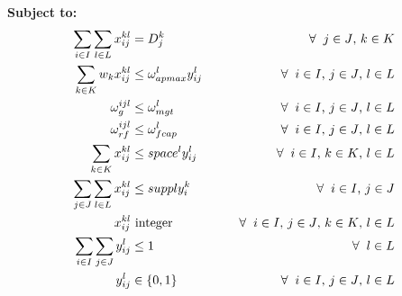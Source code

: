 \textbf{Subject to:}
\begin{align}
\sum_{i\in I}\sum_{l\in L}x_{ij}^{kl}&= D_j^{k} &\forall \hspace{2mm} j \in J \text{, } k\in K \label{eq_demand}\\
\sum_{k\in K}w_{k}x_{ij}^{kl}&\leq \omega_{apmax}^{l}y_{ij}^l &\forall \hspace{2mm} i \in I \text{, } j\in J \text{, } l \in L \label{eq_payloadCap}\\
\omega_{g}^{ijl}&\leq \omega_{mgt}^l &\forall \hspace{2mm} i \in I \text{, } j\in J \text{, } l \in L \label{eq_maxGrosstakeoff}\\
\omega_{rf}^{ijl} &\leq \omega_{fcap}^l &\forall \hspace{2mm} i \in I \text{, } j\in J \text{, } l \in L \label{eq_fuelCap}\\
\sum_{k\in K}x_{ij}^{kl} &\leq space^{l}y_{ij}^l  &\forall \hspace{2mm}  i\in I \text{, } k\in K \text{, } l\in L \label{eq_spaceCap}\\
\sum_{j\in J}\sum_{l \in L}x_{ij}^{kl} &\leq supply_i^k &\forall\hspace{2mm} i \in I \text{, } j\in J \label{eq_supplyconstraint}\\
x_{ij}^{kl}& \text{  integer}  \hspace{15mm}&\forall \hspace{2mm} i\in I \text{, } j \in J \text{, } k\in K \text{, } l \in L \label{eq_IntegerPAllets}\\ 
\sum_{i \in I}\sum_{j\in J}y_{ij}^l &\leq 1 &\forall \hspace{2mm} l \in L \label{eq_AC_Assignment}\\
y_{ij}^l &\in \{0,1\} &\forall \hspace{2mm} i \in I \text{, } j \in J \text{, } l\in L \label{eq_binaryAssignment}
\end{align}

\pagebreak
